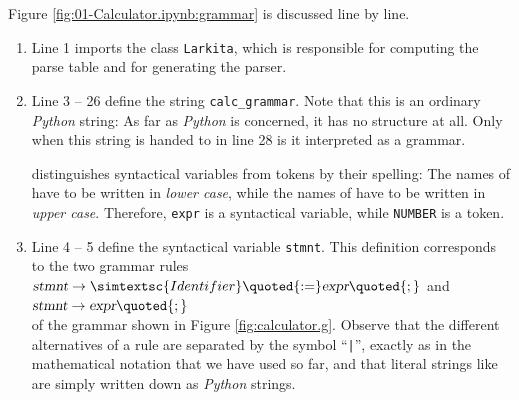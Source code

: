 \noindent
Figure \ref{fig:01-Calculator.ipynb:grammar} is discussed line by line.
\begin{enumerate}
\item Line 1 imports the class \texttt{Larkita}, which is responsible for computing the parse table and for
      generating the parser.
\item Line 3 -- 26 define the string \texttt{calc\_grammar}.  Note that this is an ordinary
      \textsl{Python} string:  As far as \textsl{Python} is concerned, it has no structure at all.  Only
      when this string is handed to  in line 28 is it interpreted as a grammar.

       distinguishes syntactical variables from tokens by their spelling:  The names of
       have to be written in \textsl{lower case}, while the names of
       have to be written in \textsl{upper case}.  Therefore, \texttt{expr} is a syntactical
      variable, while \texttt{NUMBER} is a token.
\item Line 4 -- 5 define the syntactical variable \texttt{stmnt}.  This definition corresponds to the two
      grammar rules
      \\[0.2cm]
      \hspace*{1.3cm}
      $\textsl{stmnt} \rightarrow \simtextsc{Identifier} \quoted{:=} \textsl{expr} \quoted{;}$
      \quad and \quad
      $\textsl{stmnt} \rightarrow \textsl{expr} \quoted{;}$
      \\[0.2cm]
      of the grammar shown in Figure \ref{fig:calculator.g}.  Observe that the different alternatives of a
      rule are separated by the symbol ``\texttt{|}'', exactly as in the mathematical notation that we
      have used so far, and that literal strings like \squoted{:=} are simply written down as
      \textsl{Python} strings.


\end{enumerate}
